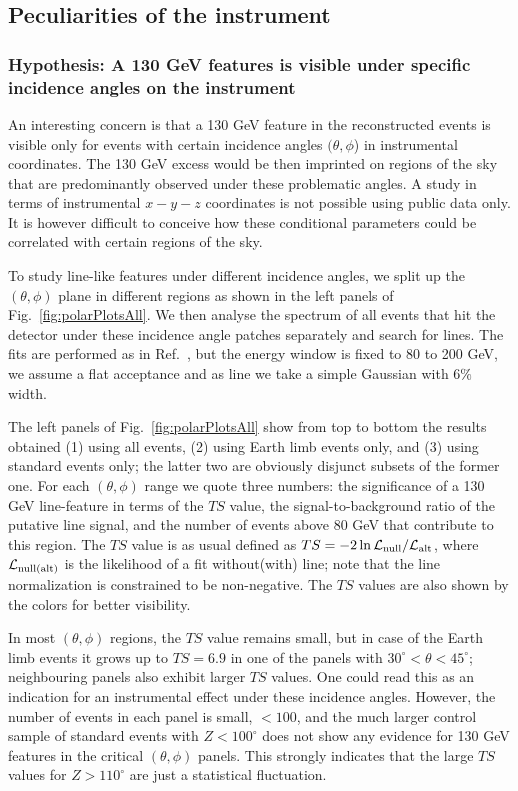 \documentclass[aps,twocolumn,prd,superscriptaddress,showpacs,nofootinbib,fixfloat]{revtex4}
\begin{document}
\subsection{Peculiarities of the instrument}

\subsubsection{Hypothesis: A 130 GeV features is visible under specific
incidence angles on the instrument}

An interesting concern is that a 130 GeV feature in the reconstructed events
is visible only for events with certain incidence angles $(\theta, \phi$) in
instrumental coordinates. The 130 GeV excess would be then imprinted on
regions of the sky that are predominantly observed under these problematic
angles. A study in terms of instrumental $x-y-z$ coordinates is not possible
using public data only. It is however difficult to conceive how these
conditional parameters could be correlated with certain regions of the sky.

To study line-like features under different incidence angles, we split up the
$(\theta, \phi)$ plane in different regions as shown in the left panels of
Fig.~\ref{fig:polarPlotsAll}. We then analyse the spectrum of all events that
hit the detector under these incidence angle patches separately and search for
lines. The fits are performed as in Ref.~\cite{Weniger:2012}, but the energy
window is fixed to 80 to 200 GeV, we assume a flat acceptance and as line we
take a simple Gaussian with $6\%$ width.

The left panels of Fig.~\ref{fig:polarPlotsAll} show from top to bottom the
results obtained (1) using all events, (2) using Earth limb events only, and
(3) using standard events only; the latter two are obviously disjunct subsets
of the former one. For each $(\theta, \phi)$ range we quote three numbers: the
significance of a 130 GeV line-feature in terms of the $TS$ value, the
signal-to-background ratio of the putative line signal, and the number of
events above 80 GeV that contribute to this region. The $TS$ value is as usual
defined as $TS=-2\ln \mathcal{L}_{\rm null}/\mathcal{L}_{\rm alt}$, where
$\mathcal{L}_{\rm null(alt)}$ is the likelihood of a fit without(with) line;
note that the line normalization is constrained to be non-negative. The $TS$
values are also shown by the colors for better visibility.

In most $(\theta,\phi)$ regions, the $TS$ value remains small, but in case of
the Earth limb events it grows up to $TS=6.9$ in one of the panels with
$30^\circ<\theta<45^\circ$; neighbouring panels also exhibit larger $TS$
values. One could read this as an indication for an instrumental effect under
these incidence angles. However, the number of events in each panel is small,
$<100$, and the much larger control sample of standard events with
$Z<100^\circ$ does not show any evidence for 130 GeV features in the critical
$(\theta, \phi)$ panels. This strongly indicates that the large $TS$ values
for $Z>110^\circ$ are just a statistical fluctuation. 
\end{document}
